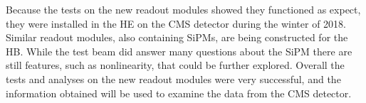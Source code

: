 Because the tests on the new readout modules showed they functioned as expect, they were installed in the HE on the CMS detector during the winter of 2018. Similar readout modules, also containing SiPMs, are being constructed for the HB. While the test beam did answer many questions about the SiPM there are still features, such as nonlinearity, that could be further explored. Overall the tests and analyses on the new readout modules were very successful, and the information obtained will be used to examine the data from the CMS detector.

